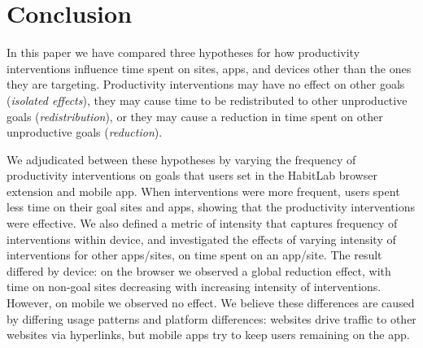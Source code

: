 \section{Conclusion}


In this paper we have compared three hypotheses for how productivity interventions influence time spent on sites, apps, and devices other than the ones they are targeting. Productivity interventions may have no effect on other goals (\textit{isolated effects}), they may cause time to be redistributed to other unproductive goals (\textit{redistribution}), or they may cause a reduction in time spent on other unproductive goals (\textit{reduction}).

We adjudicated between these hypotheses by varying the frequency of productivity interventions on goals that users set in the HabitLab browser extension and mobile app. When interventions were more frequent, users spent less time on their goal sites and apps, showing that the productivity interventions were effective. We also defined a metric of intensity that captures frequency of interventions within device, and investigated the effects of varying intensity of interventions for other apps/sites, on time spent on an app/site. The result differed by device: on the browser we observed a global reduction effect, with time on non-goal sites decreasing with increasing intensity of interventions. However, on mobile we observed no effect. We believe these differences are caused by differing usage patterns and platform differences: websites drive traffic to other websites via hyperlinks, but mobile apps try to keep users remaining on the app. %


